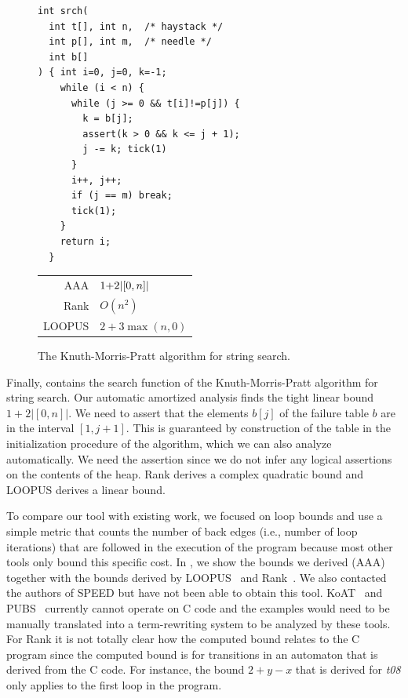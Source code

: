 \documentclass[nocopyrightspace,preprint,pldi]{sigplanconf-pldi15}
\newcommand{\pref}[1]{\prettyref{#1}}
\begin{document}
\begin{figure}[t]
  \centering
    \begin{minipage}[b]{.9\linewidth}
    \begin{center}
   \begin{lstlisting}
int srch(
  int t[], int n,  /* haystack */
  int p[], int m,  /* needle */
  int b[]
) { int i=0, j=0, k=-1;
    while (i < n) {
      while (j >= 0 && t[i]!=p[j]) {
        k = b[j];
        assert(k > 0 && k <= j + 1);
        j -= k; tick(1)
      }
      i++, j++;
      if (j == m) break;
      tick(1);
    }
    return i;
  }
   \end{lstlisting}
\vspace{-1.2cm}
\hspace{3.8cm}
\footnotesize
\begin{tabular}{|rl|}
\hline
AAA & $1 {+} 2|[0,n]|$ \\
Rank & $O(n^2)$ \\
LOOPUS & $2 {+} 3\max(n, 0)$\\
\hline
\end{tabular}
    \end{center}
\vspace{-0.1cm}
  \end{minipage}
  \caption{The Knuth-Morris-Pratt algorithm for string search.}
  \label{fig:KMP}
\end{figure}


Finally, \pref{fig:KMP} contains the search function of the
Knuth-Morris-Pratt algorithm for string search.  Our automatic
amortized analysis finds the tight linear bound $1+2|[0,n]|$.  We need
to assert that the elements $b[j]$ of the failure table $b$ are in the
interval $[1,j+1]$.  This is guaranteed by
construction of the table in the initialization procedure of the
algorithm, which we can also analyze automatically.  We need the
assertion since we do not infer any logical assertions on the contents
of the heap.  Rank derives a complex quadratic bound and LOOPUS
derives a linear bound.


To compare our tool with existing work, we focused on loop bounds and
use a simple metric that counts the number of back edges (i.e., number
of loop iterations) that are followed in the execution of the program
because most other tools only bound this specific cost. In
\pref{fig:compar}, we show the bounds we derived (AAA) together with
the bounds derived by LOOPUS~\cite{SinnZV14} and
Rank~\cite{AliasDFG10}.  We also contacted the authors of SPEED but
have not been able to obtain this tool.
KoAT~\cite{BrockschmidtEFFG14} and PUBS~\cite{AlbertAGPZ12} currently
cannot operate on C code and the examples would need to be manually
translated into a term-rewriting system to be analyzed by these tools.  For
Rank it is not totally clear how the computed bound relates to the C
program since the computed bound is for transitions in an automaton
that is derived from the C code.  For instance, the bound $2+y-x$ that
is derived for \emph{t08} only applies to the first loop in the
program.
\end{document}
